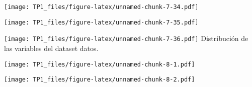 \documentclass[
]{article}
\newenvironment{Shaded}{\begin{snugshade}}{\end{snugshade}}
\newcommand{\DataTypeTok}[1]{\textcolor[rgb]{0.13,0.29,0.53}{#1}}
\newcommand{\DecValTok}[1]{\textcolor[rgb]{0.00,0.00,0.81}{#1}}
\newcommand{\KeywordTok}[1]{\textcolor[rgb]{0.13,0.29,0.53}{\textbf{#1}}}
\newcommand{\NormalTok}[1]{#1}
\newcommand{\OperatorTok}[1]{\textcolor[rgb]{0.81,0.36,0.00}{\textbf{#1}}}
\newcommand{\StringTok}[1]{\textcolor[rgb]{0.31,0.60,0.02}{#1}}
\begin{document}
\texttt{[image: TP1\_files/figure-latex/unnamed-chunk-7-34.pdf]}

\begin{Shaded}
\end{Shaded}

\texttt{[image: TP1\_files/figure-latex/unnamed-chunk-7-35.pdf]}

\begin{Shaded}
\end{Shaded}

\texttt{[image: TP1\_files/figure-latex/unnamed-chunk-7-36.pdf]}
Distribución de las variables del dataset datos.

\begin{Shaded}
\end{Shaded}

\texttt{[image: TP1\_files/figure-latex/unnamed-chunk-8-1.pdf]}

\begin{Shaded}
\end{Shaded}

\texttt{[image: TP1\_files/figure-latex/unnamed-chunk-8-2.pdf]}

\begin{Shaded}
\end{Shaded}
\end{document}
